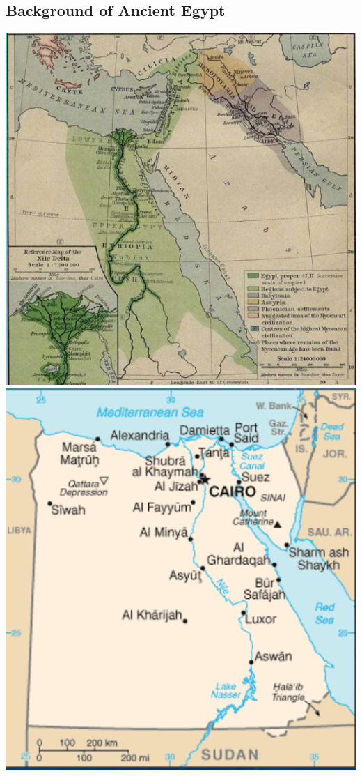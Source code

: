 \documentclass[11pt]{article}
\begin{document}
\subsection{Background of Ancient Egypt}
\label{sec-4-5}
\includegraphics[width=.9\linewidth]{img/ancegyptMap.png}
\includegraphics[width=.9\linewidth]{img/modegyptMap.png}
\end{document}
